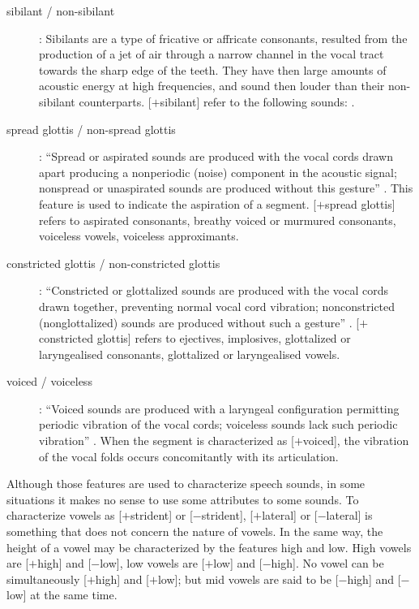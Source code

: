 \begin{description}
\item[sibilant / non-sibilant] : Sibilants are a type of fricative or affricate consonants, resulted from the production of a jet of air through a narrow channel in the vocal tract towards the sharp edge of the teeth. They have then large amounts of acoustic energy at high frequencies, and sound then louder than their non-sibilant counterparts. [$+$sibilant] refer to the following sounds: \textipa{[s,S,z,Z]}.

\item[spread glottis / non-spread glottis] : ``Spread or aspirated sounds are produced with the vocal cords drawn apart producing a nonperiodic (noise) component in the acoustic signal; nonspread or unaspirated sounds are produced without this gesture'' \citep{chomsky1968a}. This feature is used to indicate the aspiration of a segment. [$+$spread glottis] refers to aspirated consonants, breathy voiced or murmured consonants, voiceless vowels, voiceless approximants.

\item[constricted glottis / non-constricted glottis] : ``Constricted or glottalized sounds are produced with the vocal cords drawn together, preventing normal vocal cord vibration; nonconstricted (nonglottalized) sounds are produced without such a gesture'' \citep{chomsky1968a}. [$+$constricted glottis] refers to ejectives, implosives, glottalized or laryngealised consonants, glottalized or laryngealised vowels.

\item[voiced / voiceless] : ``Voiced sounds are produced with a laryngeal configuration permitting periodic vibration of the vocal cords; voiceless sounds lack such periodic vibration'' \citep{chomsky1968a}. When the segment is characterized as [$+$voiced], the vibration of the vocal folds occurs concomitantly with its articulation.

\end{description}


Although those features are used to characterize speech sounds, in some situations it makes no sense to use some attributes to some sounds. To characterize vowels as [$+$strident] or [$-$strident], [$+$lateral] or [$-$lateral] is something that does not concern the nature of vowels.
In the same way, the height of a vowel may be characterized by the features high and low. High vowels are [$+$high] and [$-$low], low vowels are [$+$low] and [$-$high]. No vowel can be simultaneously [$+$high] and [$+$low]; but mid vowels are said to be [$-$high] and [$-$low] at the same time.

